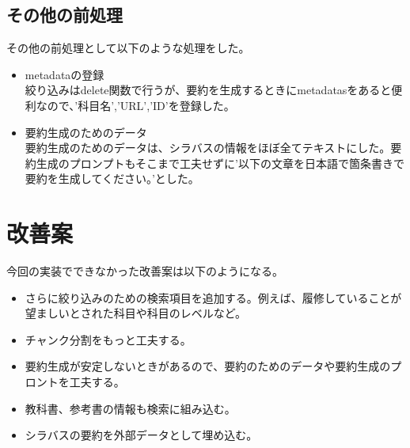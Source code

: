\subsection{その他の前処理}
その他の前処理として以下のような処理をした。\\

\begin{itemize}
  \item metadataの登録\\
  絞り込みはdelete関数で行うが、要約を生成するときにmetadatasをあると便利なので、'科目名','URL','ID'を登録した。\\
  \item 要約生成のためのデータ\\
  要約生成のためのデータは、シラバスの情報をほぼ全てテキストにした。要約生成のプロンプトもそこまで工夫せずに'以下の文章を日本語で箇条書きで要約を生成してください。'とした。
\end{itemize}

\section{改善案}
今回の実装でできなかった改善案は以下のようになる。
\begin{itemize}
  \item さらに絞り込みのための検索項目を追加する。例えば、履修していることが望ましいとされた科目や科目のレベルなど。
  \item チャンク分割をもっと工夫する。
  \item 要約生成が安定しないときがあるので、要約のためのデータや要約生成のプロントを工夫する。
  \item 教科書、参考書の情報も検索に組み込む。
  \item シラバスの要約を外部データとして埋め込む。
\end{itemize}
